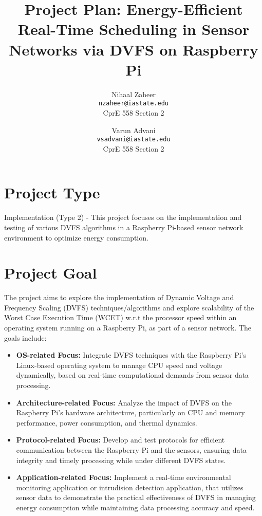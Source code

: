 \documentclass[twocolumn, 10pt]{article}
\title{\textbf{Project Plan: Energy-Efficient Real-Time Scheduling in Sensor Networks via DVFS on Raspberry Pi}}
\author{
    Nihaal Zaheer \\
    \texttt{nzaheer@iastate.edu} \\
    CprE 558 Section 2
    \and
    Varun Advani \\
    \texttt{vsadvani@iastate.edu} \\
    CprE 558 Section 2
}
\date{}
\begin{document}
\maketitle

\section*{Project Type}
\vspace{-2mm}
Implementation (Type 2) - This project focuses on the implementation and testing of various DVFS algorithms in a Raspberry Pi-based sensor network environment to optimize energy consumption.

\vspace{-3mm}

\section*{Project Goal}
\vspace{-2mm}
The project aims to explore the implementation of Dynamic Voltage and Frequency Scaling (DVFS) techniques/algorithms and explore scalability of the Worst Case Execution Time (WCET) w.r.t the processor speed within an operating system running on a Raspberry Pi, as part of a sensor network. The goals include:

\begin{itemize}
    \item \textbf{OS-related Focus:} Integrate DVFS techniques with the Raspberry Pi's Linux-based operating system to manage CPU speed and voltage dynamically, based on real-time computational demands from sensor data processing.
    \item \textbf{Architecture-related Focus:} Analyze the impact of DVFS on the Raspberry Pi's hardware architecture, particularly on CPU and memory performance, power consumption, and thermal dynamics.
    \item \textbf{Protocol-related Focus:} Develop and test protocols for efficient communication between the Raspberry Pi and the sensors, ensuring data integrity and timely processing while under different DVFS states.
    \item \textbf{Application-related Focus:} Implement a real-time environmental monitoring application or intrudision detection application, that utilizes sensor data to demonstrate the practical effectiveness of DVFS in managing energy consumption while maintaining data processing accuracy and speed.
\end{itemize}
\end{document}
